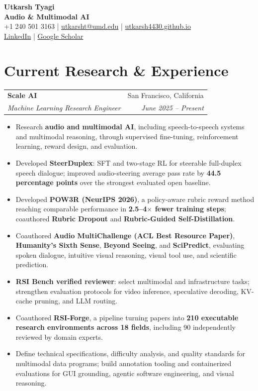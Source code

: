 \documentclass[letterpaper,11pt]{article}
\makeatletter
\newcommand{\role}[4]{%
  \Needspace{4\baselineskip}%
  \begin{tabularx}{\linewidth}{@{}Xr@{}}
    \textbf{#1} & \small #2\\
    \textit{#3} & \small\textit{#4}
  \end{tabularx}\vspace{-1pt}}
\makeatother
\begin{document}
\begin{center}
  {\fontsize{24}{26}\selectfont\textbf{Utkarsh Tyagi}}\\[4pt]
  {\small\textbf{Audio \& Multimodal AI}}\\[4pt]
  {\small +1 240 501 3163 \enspace | \enspace
    \href{mailto:utkarsht@umd.edu}{utkarsht@umd.edu} \enspace | \enspace
    \href{https://utkarsh4430.github.io}{utkarsh4430.github.io}\\[2pt]
    \href{https://linkedin.com/in/utkarsh4430/}{LinkedIn} \enspace | \enspace
    \href{https://scholar.google.com/citations?user=RLjKaTwAAAAJ&hl=en}{Google Scholar}}
\end{center}
\vspace{-8pt}
\fontsize{10}{11.8}\selectfont

\section{Current Research \& Experience}
\role{Scale AI}{San Francisco, California}
  {Machine Learning Research Engineer}{June 2025 -- Present}
\begin{itemize}
  \item Research \textbf{audio and multimodal AI}, including speech-to-speech systems and multimodal reasoning, through supervised fine-tuning, reinforcement learning, reward design, and evaluation.
  \item Developed \textbf{SteerDuplex}: SFT and two-stage RL for steerable full-duplex speech dialogue; improved audio-steering average pass rate by \textbf{44.5 percentage points} over the strongest evaluated open baseline.
  \item Developed \textbf{POW3R (NeurIPS 2026)}, a policy-aware rubric reward method reaching comparable performance in \textbf{2.5--4$\times$ fewer training steps}; coauthored \textbf{Rubric Dropout} and \textbf{Rubric-Guided Self-Distillation}.
  \item Coauthored \textbf{Audio MultiChallenge (ACL Best Resource Paper)}, \textbf{Humanity's Sixth Sense}, \textbf{Beyond Seeing}, and \textbf{SciPredict}, evaluating spoken dialogue, intuitive visual reasoning, visual tool use, and scientific prediction.
  \item \textbf{RSI Bench verified reviewer}: select multimodal and infrastructure tasks; strengthen evaluation protocols for video inference, speculative decoding, KV-cache pruning, and LLM routing.
  \item Coauthored \textbf{RSI-Forge}, a pipeline turning papers into \textbf{210 executable research environments across 18 fields}, including 90 independently reviewed by domain experts.
  \item Define technical specifications, difficulty analysis, and quality standards for multimodal data programs; build annotation tooling and containerized evaluations for GUI grounding, agentic software engineering, and visual reasoning.
\end{itemize}
\end{document}
